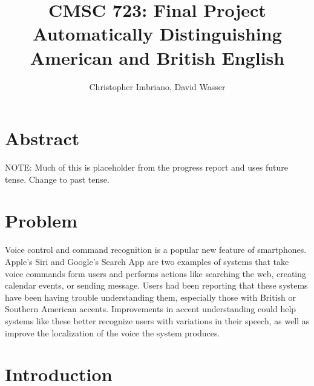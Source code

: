 \documentclass[11pt, letterpaper, oneside]{article}
\begin{document}
\title{CMSC 723: Final Project \\ Automatically Distinguishing American and British English}
\author{Christopher Imbriano, David Wasser}

\maketitle




\section{Abstract}

NOTE:  Much of this is placeholder from the progress report and uses future tense.  Change to past tense.

\section{Problem}
Voice control and command recognition is a popular new feature of smartphones. 
Apple's Siri and Google's Search App are two examples of systems that take voice commands form users and performs actions like searching the web, creating calendar events, or sending message.
Users had been reporting that these systems have been having trouble understanding them, especially those with British or Southern American accents. 
Improvements in accent understanding could help systems like these better recognize users with variations in their speech, as well as improve the localization of the voice the system produces.

\section{Introduction}
\end{document}
